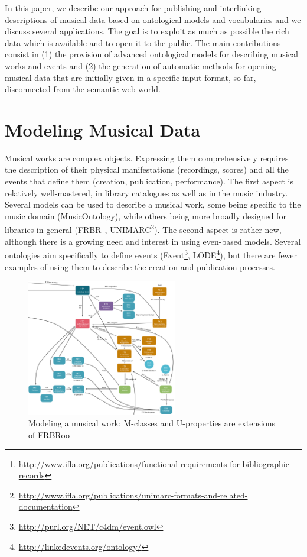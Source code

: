 \documentclass{llncs}
\begin{document}
In this paper, we describe our approach for publishing and interlinking descriptions of musical data based on ontological models and vocabularies and we discuss several applications. The goal is to exploit as much as possible the rich data which is available and to open it to the public. The main contributions consist in (1) the provision of advanced ontological models for describing musical works and events and (2) the generation of automatic methods for opening musical data that are initially given in a specific input format, so far, disconnected from the semantic web world.


\section{Modeling Musical Data}
\label{sec:modeling}
Musical works are complex objects. Expressing them comprehensively requires the description of their physical manifestations (recordings, scores) and all the events that define them (creation, publication, performance). The first aspect is relatively well-mastered, in library catalogues as well as in the music industry. Several models can be used to describe a musical work, some being specific to the music domain (MusicOntology), while others being more broadly designed for libraries in general (FRBR\footnote{\url{http://www.ifla.org/publications/functional-requirements-for-bibliographic-records}}, UNIMARC\footnote{\url{http://www.ifla.org/publications/unimarc-formats-and-related-documentation}}). The second aspect is rather new, although there is a growing need and interest in using even-based models. Several ontologies aim specifically to define events (Event\footnote{\url{http://purl.org/NET/c4dm/event.owl}}, LODE\footnote{\url{http://linkedevents.org/ontology/}}), but there are fewer examples of using them to describe the creation and publication processes.
\begin{figure}[htbp]
  \centering
  \includegraphics[height=6cm]{img/modelingdata_fig3.png}
  \caption{Modeling a musical work: M-classes and U-properties are extensions of FRBRoo}
  \label{fig:work}
\end{figure}
\end{document}
